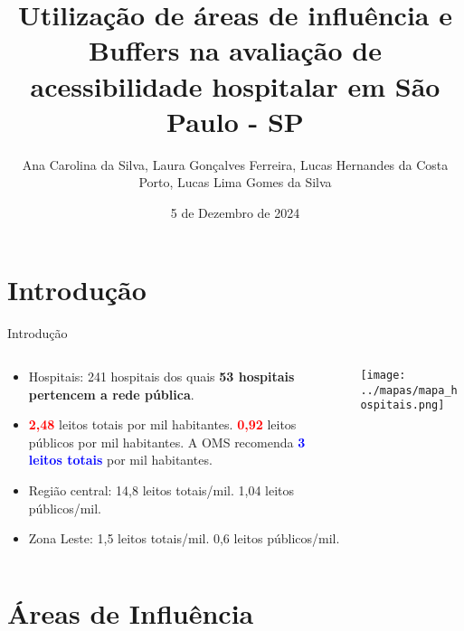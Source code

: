 \documentclass{beamer}
\title{Utilização de áreas de influência e Buffers na avaliação de acessibilidade hospitalar em São Paulo - SP}
\author{Ana Carolina da Silva, Laura Gonçalves Ferreira,  Lucas Hernandes da Costa Porto, Lucas Lima Gomes da Silva}
\institute{Universidade de São Paulo}
\date{5 de Dezembro de 2024} %
\begin{document}
\begin{frame}
    \titlepage
\end{frame}


\section{Introdução}
\begin{frame}{Introdução}
    \begin{columns}
        \begin{column}{0.6\textwidth}
            \begin{itemize}
                \item Hospitais: 241 hospitais dos quais \textbf{53 hospitais pertencem a rede pública}.
                \item \textbf{\textcolor{red}{2,48}} leitos totais por mil habitantes. \textbf{\textcolor{red}{0,92}} leitos públicos por mil habitantes. A OMS recomenda \textbf{\textcolor{blue}{3 leitos totais}} por mil habitantes.
                \item Região central: 14,8 leitos totais/mil. 1,04 leitos públicos/mil.
                \item Zona Leste: 1,5 leitos totais/mil. 0,6 leitos públicos/mil.
            \end{itemize}
        \end{column}

        \begin{column}{0.4\textwidth}
            \centering
            \texttt{[image: ../mapas/mapa\_hospitais.png]} 
        \end{column}
    \end{columns}
\end{frame}


\section{Áreas de Influência}
\end{document}
